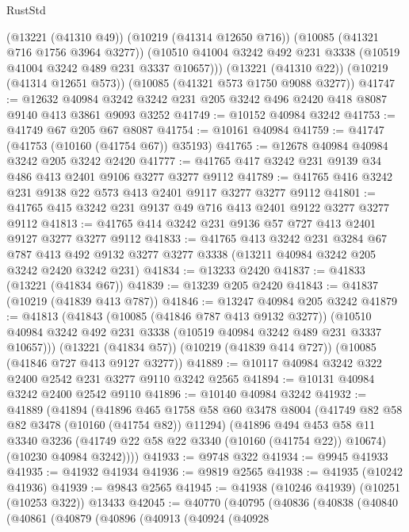 \begin{lexlean}{RustStd}
\begin{coremodule}
      (@13221 (@41310 @49))
      (@10219 (@41314 @12650 @716))
      (@10085 (@41321 @716 @1756 @3964 @3277))
      (@10510 @41004 @3242 @492 @231 @3338 (@10519 @41004 @3242 @489 @231 @3337 @10657)))
    (@13221 (@41310 @22))
    (@10219 (@41314 @12651 @573))
    (@10085 (@41321 @573 @1750 @9088 @3277))
@41747 := @12632
    @40984
    @3242
    @3242
    @231
    @205
    @3242
    @496
    @2420
    @418
    @8087
    @9140
    @413
    @3861
    @9093
    @3252
@41749 := @10152 @40984 @3242
@41753 := @41749 @67 @205 @67 @8087
@41754 := @10161 @40984
@41759 := @41747 (@41753 (@10160 (@41754 @67)) @35193)
@41765 := @12678 @40984 @40984 @3242 @205 @3242 @2420
@41777 := @41765 @417 @3242 @231 @9139 @34 @486 @413 @2401 @9106 @3277 @3277 @9112
@41789 := @41765 @416 @3242 @231 @9138 @22 @573 @413 @2401 @9117 @3277 @3277 @9112
@41801 := @41765 @415 @3242 @231 @9137 @49 @716 @413 @2401 @9122 @3277 @3277 @9112
@41813 := @41765 @414 @3242 @231 @9136 @57 @727 @413 @2401 @9127 @3277 @3277 @9112
@41833 := @41765
    @413
    @3242
    @231
    @3284
    @67
    @787
    @413
    @492
    @9132
    @3277
    @3277
    @3338
    (@13211 @40984 @3242 @205 @3242 @2420 @3242 @231)
@41834 := @13233 @2420
@41837 := @41833 (@13221 (@41834 @67))
@41839 := @13239 @205 @2420
@41843 := @41837 (@10219 (@41839 @413 @787))
@41846 := @13247 @40984 @205 @3242
@41879 := @41813
    (@41843
      (@10085 (@41846 @787 @413 @9132 @3277))
      (@10510 @40984 @3242 @492 @231 @3338 (@10519 @40984 @3242 @489 @231 @3337 @10657)))
    (@13221 (@41834 @57))
    (@10219 (@41839 @414 @727))
    (@10085 (@41846 @727 @413 @9127 @3277))
@41889 := @10117 @40984 @3242 @322 @2400 @2542 @231 @3277 @9110 @3242 @2565
@41894 := @10131 @40984 @3242 @2400 @2542 @9110
@41896 := @10140 @40984 @3242
@41932 := @41889
    (@41894
      (@41896
        @465
        @1758
        @58
        @60
        @3478
        @8004
        (@41749 @82 @58 @82 @3478 (@10160 (@41754 @82)) @11294)
        (@41896
          @494
          @453
          @58
          @11
          @3340
          @3236
          (@41749 @22 @58 @22 @3340 (@10160 (@41754 @22)) @10674)
          (@10230 @40984 @3242))))
@41933 := @9748 @322
@41934 := @9945 @41933
@41935 := @41932 @41934
@41936 := @9819 @2565
@41938 := @41935 (@10242 @41936)
@41939 := @9843 @2565
@41945 := @41938 (@10246 @41939) (@10251 (@10253 @322)) @13433
@42045 := @40770
    (@40795
      (@40836
        (@40838
          (@40840
            (@40861
              (@40879
                (@40896
                  (@40913
                    (@40924
                      (@40928

\end{coremodule}
\end{lexlean}
